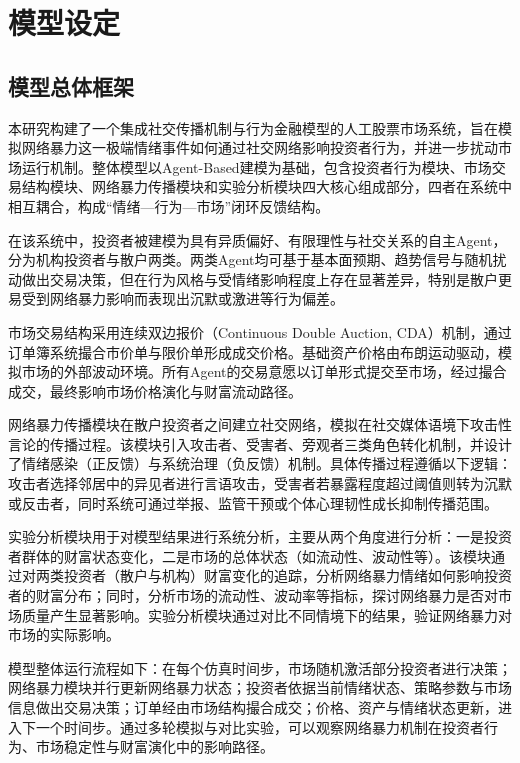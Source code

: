 \chapter{模型设定}

\section{模型总体框架}

本研究构建了一个集成社交传播机制与行为金融模型的人工股票市场系统，旨在模拟网络暴力这一极端情绪事件如何通过社交网络影响投资者行为，并进一步扰动市场运行机制。整体模型以Agent-Based建模为基础，包含投资者行为模块、市场交易结构模块、网络暴力传播模块和实验分析模块四大核心组成部分，四者在系统中相互耦合，构成“情绪—行为—市场”闭环反馈结构。

在该系统中，投资者被建模为具有异质偏好、有限理性与社交关系的自主Agent，分为机构投资者与散户两类。两类Agent均可基于基本面预期、趋势信号与随机扰动做出交易决策，但在行为风格与受情绪影响程度上存在显著差异，特别是散户更易受到网络暴力影响而表现出沉默或激进等行为偏差。

市场交易结构采用连续双边报价（Continuous Double Auction, CDA）机制，通过订单簿系统撮合市价单与限价单形成成交价格。基础资产价格由布朗运动驱动，模拟市场的外部波动环境。所有Agent的交易意愿以订单形式提交至市场，经过撮合成交，最终影响市场价格演化与财富流动路径。

网络暴力传播模块在散户投资者之间建立社交网络，模拟在社交媒体语境下攻击性言论的传播过程。该模块引入攻击者、受害者、旁观者三类角色转化机制，并设计了情绪感染（正反馈）与系统治理（负反馈）机制。具体传播过程遵循以下逻辑：攻击者选择邻居中的异见者进行言语攻击，受害者若暴露程度超过阈值则转为沉默或反击者，同时系统可通过举报、监管干预或个体心理韧性成长抑制传播范围。

实验分析模块用于对模型结果进行系统分析，主要从两个角度进行分析：一是投资者群体的财富状态变化，二是市场的总体状态（如流动性、波动性等）。该模块通过对两类投资者（散户与机构）财富变化的追踪，分析网络暴力情绪如何影响投资者的财富分布；同时，分析市场的流动性、波动率等指标，探讨网络暴力是否对市场质量产生显著影响。实验分析模块通过对比不同情境下的结果，验证网络暴力对市场的实际影响。

模型整体运行流程如下：在每个仿真时间步，市场随机激活部分投资者进行决策；网络暴力模块并行更新网络暴力状态；投资者依据当前情绪状态、策略参数与市场信息做出交易决策；订单经由市场结构撮合成交；价格、资产与情绪状态更新，进入下一个时间步。通过多轮模拟与对比实验，可以观察网络暴力机制在投资者行为、市场稳定性与财富演化中的影响路径。


